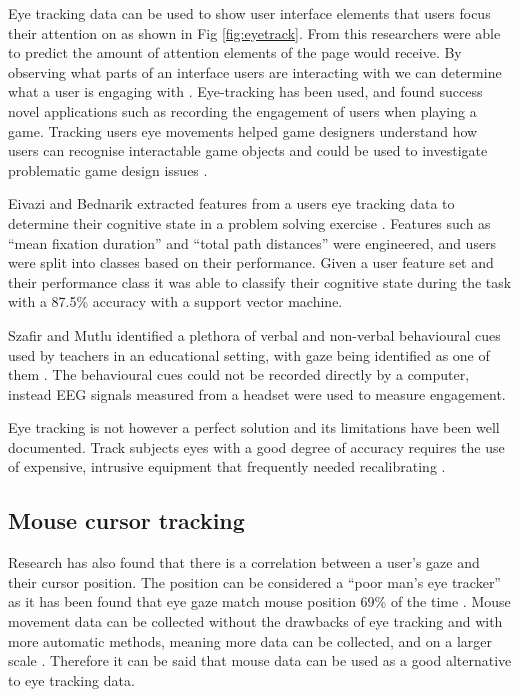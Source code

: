 \documentclass{article}
\begin{document}
Eye tracking data can be used to show user interface elements that users focus their attention on as shown in Fig \ref{fig:eyetrack}. 
From this researchers were able to predict the amount of attention elements of the page would receive.
By observing what parts of an interface users are interacting with we can determine what a user is engaging with \cite{buscher2009you}.
Eye-tracking has been used, and found success novel applications such as recording the engagement of users when playing a game. 
Tracking users eye movements helped game designers understand how users can recognise interactable game objects and could be used to investigate problematic game design issues \cite{renshaw2009towards}.

Eivazi and Bednarik extracted features from a users eye tracking data to determine their cognitive state in a problem solving exercise \cite{eivazi2011predicting}.
Features such as ``mean fixation duration'' and ``total path distances'' were engineered, and users were split into classes based on their performance. 
Given a user feature set and their performance class it was able to classify their cognitive state during the task with a 87.5\% accuracy with a support vector machine.

Szafir and Mutlu identified a plethora of verbal and non-verbal behavioural cues used by teachers in an educational setting, with gaze being identified as one of them \cite{szafir2012pay}.
The behavioural cues could not be recorded directly by a computer, instead EEG signals measured from a headset were used to measure engagement.

Eye tracking is not however a perfect solution and its limitations have been well documented. 
Track subjects eyes with a good degree of accuracy requires the use of expensive, intrusive equipment that frequently needed recalibrating \cite{richardson2004eye}. 


\subsection{Mouse cursor tracking}

Research has also found that there is a correlation between a user’s gaze and their cursor position. 
The position can be considered a ``poor man’s eye tracker'' as it has been found that eye gaze match mouse position 69\% of the time \cite{cooke2006mouse}. 
Mouse movement data can be collected without the drawbacks of eye tracking and with more automatic methods, meaning more data can be collected, and on a larger scale \cite{demvsar2017quantifying}.
Therefore it can be said that mouse data can be used as a good alternative to eye tracking data.
\end{document}
